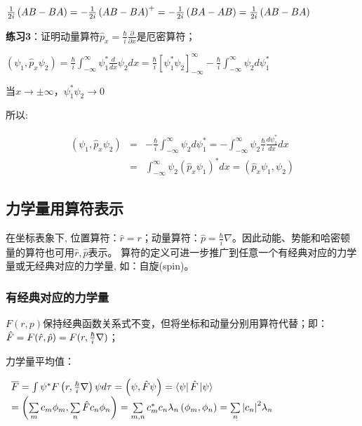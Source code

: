 ${\textstyle{1 \over {2i}}}\left( {AB - BA} \right) =  - {\textstyle{1 \over {2i}}}\left( {AB - BA} \right)^ +   =  - {\textstyle{1 \over {2i}}}\left( {BA - AB} \right) = {\textstyle{1 \over {2i}}}\left( {AB - BA} \right)$

\textbf{练习3}：证明动量算符$\hat p_x  = \frac{\hbar
}{i}\frac{\partial }{{\partial x}}$是厄密算符；

$\left( {\psi _1 ,\hat p_x \psi _2 } \right) = \frac{\hbar }{i}\int_{ - \infty }^\infty  {\psi _1 ^* \frac{d}{{dx}}} \psi _2 dx = \frac{\hbar }{i}\left[ {\psi _1 ^* \psi _2 } \right]_{ - \infty }^\infty   - \frac{\hbar }{i}\int_{ - \infty }^\infty  {\psi _2 d\psi _1 ^* } $

当$x \to  \pm \infty $，$\psi _1 ^* \psi _2  \to 0$

所以:

\begin{eqnarray*}
\left( {\psi _1 ,\hat p_x \psi _2 } \right) & = &  - \frac{\hbar
}{i}\int_{ - \infty }^\infty  {\psi _2 d\psi _1 ^* }  =  - \int_{ -
\infty }^\infty  {\psi _2 } \frac{\hbar }{i}\frac{{d\psi _1 ^*
}}{{dx}}dx \\
{} & = & \int_{ - \infty }^\infty  {\psi _2 \left( {\hat p_x
\psi _1 } \right)^* dx}  = \left( {\hat p_x \psi _1 ,\psi _2 }
\right)
\end{eqnarray*}


\subsection{力学量用算符表示}

在坐标表象下, 位置算符：$\hat r = r$；动量算符：$\hat p =
\frac{\hbar }{i}\nabla $。因此动能、势能和哈密顿量的算符也可用$\hat
r,\hat p$表示。
算符的定义可进一步推广到任意一个有经典对应的力学量或无经典对应的力学量,
如：自旋(spin)。

\subsubsection{有经典对应的力学量}

$F(r,p)$保持经典函数关系式不变，但将坐标和动量分别用算符代替；即：$\hat F = F(\hat r,\hat p) = F(r,{\textstyle{\hbar  \over i}}\nabla )$；

力学量平均值：

\begin{center}
$\begin{array}{l}
 \overline F  = \int {\psi ^* F\left( {r,{\textstyle{\hbar  \over i}}\nabla } \right)\psi d\tau }  = \left( {\psi ,\hat F \psi } \right) = \left\langle \psi  \right|\hat F\left| \psi  \right\rangle  \\
  = \left( {\sum\limits_m {c_m \phi _m } ,\sum\limits_n {\hat F c_n \phi _n } } \right) = \sum\limits_{m,n} {c^* _m c_n \lambda _n \left( {\phi _m ,\phi _n } \right)}  = \sum\limits_n {\left| {c_n } \right|} ^2 \lambda _n  \\
 \end{array}$
\end{center}

